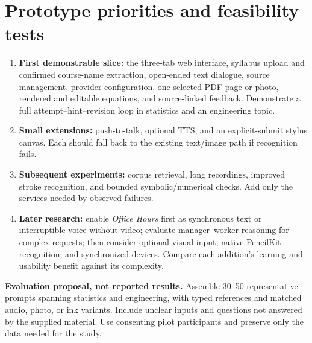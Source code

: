 \documentclass[11pt]{article}
\begin{document}
\section{Prototype priorities and feasibility tests}
\begin{enumerate}
\item \textbf{First demonstrable slice:} the three-tab web interface, syllabus upload and confirmed course-name extraction, open-ended text dialogue, source management, provider configuration, one selected PDF page or photo, rendered and editable equations, and source-linked feedback. Demonstrate a full attempt--hint--revision loop in statistics and an engineering topic.
\item \textbf{Small extensions:} push-to-talk, optional TTS, and an explicit-submit stylus canvas. Each should fall back to the existing text/image path if recognition fails.
\item \textbf{Subsequent experiments:} corpus retrieval, long recordings, improved stroke recognition, and bounded symbolic/numerical checks. Add only the services needed by observed failures.
\item \textbf{Later research:} enable \emph{Office Hours} first as synchronous text or interruptible voice without video; evaluate manager--worker reasoning for complex requests; then consider optional visual input, native PencilKit recognition, and synchronized devices. Compare each addition's learning and usability benefit against its complexity.
\end{enumerate}

\textbf{Evaluation proposal, not reported results.} Assemble 30--50 representative prompts spanning statistics and engineering, with typed references and matched audio, photo, or ink variants. Include unclear inputs and questions not answered by the supplied material. Use consenting pilot participants and preserve only the data needed for the study.
\end{document}
